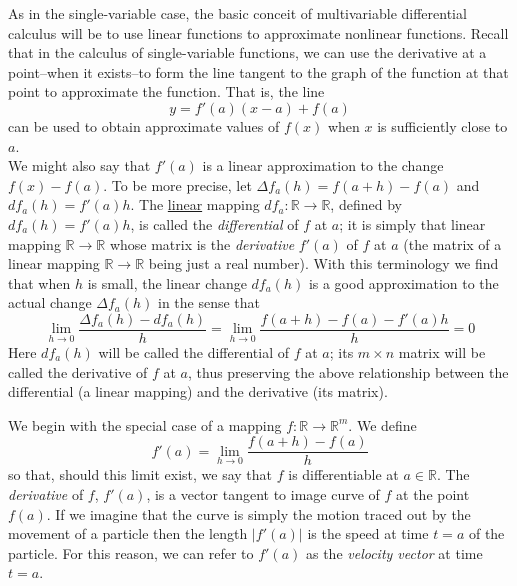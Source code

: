 As in the single-variable case, the basic conceit of multivariable differential calculus will be to use linear functions to approximate nonlinear functions. Recall that in the calculus of single-variable functions, we can use the derivative at a point--when it exists--to form the line tangent to the graph of the function at that point to approximate the function. That is, the line
\[
y = f'(a)(x-a)+f(a)
\]
can be used to obtain approximate values of \( f(x) \) when \( x \) is sufficiently close to \( a \).
\\

We might also say that \( f'(a) \) is a linear approximation to the change \linebreak \( f(x)-f(a) \). To be more precise, let \( \Delta f_a(h) = f(a+h)-f(a) \) and \( df_a(h) = f'(a)h \). The \underline{linear} mapping \( df_a: \mathbb{R} \rightarrow \mathbb{R} \), defined by \(df_a(h) = f'(a)h\), is called the \emph{differential} of \( f \) at \( a \); it is simply that linear mapping \( \mathbb{R} \rightarrow \mathbb{R} \) whose matrix is the \emph{derivative} \( f'(a) \) of \( f \) at \( a \) (the matrix of a linear mapping \( \mathbb{R} \rightarrow \mathbb{R} \) being just a real number). With this terminology we find that when \( h \) is small, the linear change \( df_a(h) \) is a good approximation to the actual change \( \Delta f_a(h) \) in the sense that
\[
\lim_{h \rightarrow 0} \frac{\Delta f_a(h) - df_a(h)}{h} = \lim_{h \rightarrow 0} \frac{f(a+h)-f(a)-f'(a)h}{h} = 0
\]
Here \( df_a(h) \) will be called the differential of \( f \) at \( a \); its \( m \times n \) matrix will be called the derivative of \( f \) at \( a \), thus preserving the above relationship between the differential (a linear mapping) and the derivative (its matrix). 

We begin with the special case of a mapping \( f: \mathbb{R} \rightarrow \mathbb{R}^m \). We define
\[
f'(a) = \lim_{h \rightarrow 0} \frac{f(a+h)-f(a)}{h}
\]
so that, should this limit exist, we say that \( f \) is differentiable at \( a \in \mathbb{R} \). The \emph{derivative} of \( f \), \( f'(a) \), is a vector tangent to image curve of \( f \) at the point \( f(a) \). If we imagine that the curve is simply the motion traced out by the movement of a particle then the length \( \left| f'(a) \right| \) is the speed at time \( t=a \) of the particle. For this reason, we can refer to \( f'(a) \) as the \emph{velocity vector} at time \( t=a \). 
\\

